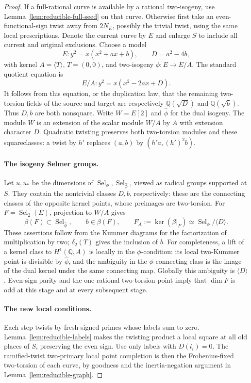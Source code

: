 \begin{proof}
If a full-rational curve is available by a rational two-isogeny, use
Lemma~\ref{lem:reducible-full-seed} on that curve.  Otherwise first take
an even-functional-sign twist away from \(2N_E\), possibly the trivial
twist, using the same local prescriptions.  Denote the current curve by
\(E\) and enlarge \(S\) to include all current and original exclusions.
Choose a model
\[
 E:y^2=x(x^2+ax+b),\qquad D=a^2-4b,
\]
with kernel \(A=\langle T\rangle\), \(T=(0,0)\), and two-isogeny
\(\phi:E\to E/A\).  The standard quotient equation is
\[
 E/A:y^2=x(x^2-2ax+D).
\]
It follows from this equation, or the duplication law, that the remaining
two-torsion fields of the source and target are respectively
\(\mathbb Q(\sqrt D)\) and \(\mathbb Q(\sqrt b)\).  Thus \(D,b\) are both
nonsquare.  Write \(W=E[2]\) and \(\widehat\phi\) for the dual isogeny.
The module \(W\) is an extension of the scalar module \(W/A\) by \(A\)
with extension character \(D\).  Quadratic twisting preserves both
two-torsion modules and these squareclasses: a twist by \(h'\) replaces
\((a,b)\) by \((h'a,(h')^2b)\).

\paragraph{The isogeny Selmer groups.}
Let \(u,u_*\) be the dimensions of
\(\operatorname{Sel}_\phi,\operatorname{Sel}_{\widehat\phi}\), viewed as
radical groups supported at \(S\).  They contain the nontrivial classes
\(D,b\), respectively: these are the connecting classes of the opposite
kernel points, whose preimages are two-torsion.  For
\(F=\operatorname{Sel}_2(E)\), projection to \(W/A\) gives
\[
 \beta(F)\subset\operatorname{Sel}_{\widehat\phi},\qquad
 b\in\beta(F),\qquad
 F_A:=\ker(\beta|_F)\simeq\operatorname{Sel}_\phi/\langle D\rangle.
\]
These assertions follow from the Kummer diagrams for the factorization
of multiplication by two; \(\delta_2(T)\) gives the inclusion of \(b\).
For completeness, a lift of a kernel class to \(H^1(\mathbb Q,A)\) is
locally in the \(\phi\)-condition: its local two-Kummer point is divisible
by \(\widehat\phi\), and the ambiguity in the \(\phi\)-connecting class
is the image of the dual kernel under the same connecting map.  Globally
this ambiguity is \(\langle D\rangle\).  Even-sign parity and the one
rational two-torsion point imply that \(\dim F\) is odd at this stage and
at every subsequent stage.

\paragraph{The new local conditions.}
Each step twists by fresh signed primes whose labels sum to zero.
Lemma~\ref{lem:reducible-labels} makes the twisting product a local square
at all old places of \(S\), preserving the even sign.  Use only labels
with \(D(l_i)=0\).  The ramified-twist two-primary local point completion
is then the Frobenius-fixed two-torsion of each curve, by goodness and the
inertia-negation argument in Lemma~\ref{lem:reducible-graph}.


\end{proof}
